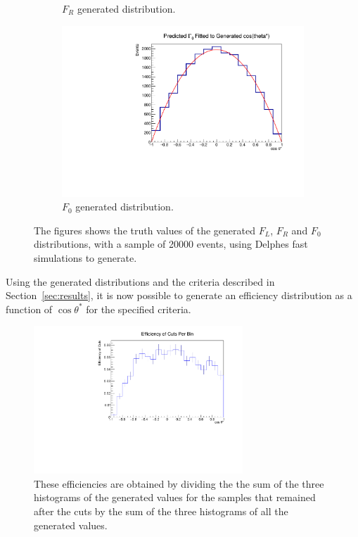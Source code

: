 \documentclass[12pt,a4paper]{article}
\numberwithin{equation}{section}
\begin{document}
\begin{figure}[t!]
\begin{subfigure}[t]{0.5\textwidth}
        \caption{$F_R$ generated distribution.}
      \end{subfigure}
    \begin{subfigure}[t]{0.5\textwidth}
        \centering
        \includegraphics[width=1.0\textwidth]{figures/delphes_gen0}
        \caption{$F_0$ generated distribution.}
    \end{subfigure}
    \caption{The figures shows the truth values of the generated $F_L$, $F_R$ and
      $F_0$ distributions, with a sample of 20000 events, using Delphes fast
      simulations to generate.}\label{fig:delphesdist}
\end{figure}

Using the generated distributions and the criteria described in
Section~\ref{sec:results}, it is now possible to generate an efficiency
distribution as a function of $\cos \theta^*$ for the specified criteria.

\begin{figure}[H]
  \centering
  \includegraphics[width=0.7\textwidth]{figures/efficiency}
  \caption{\label{fig:efficiency}These efficiencies are obtained by dividing the
    the sum of the three histograms of the generated values for the samples that
    remained after the cuts by the sum of the three histograms of all the
    generated values.}
\end{figure}
\end{document}
